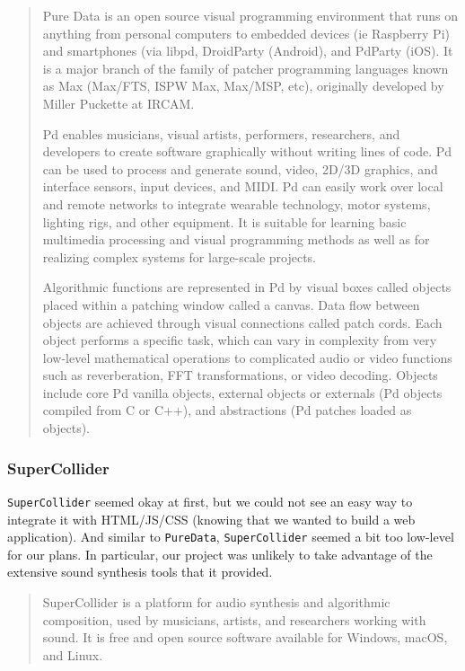 \documentclass[12pt,a4paper]{article}
\newcommand{\lightcode}[1]{\colorbox{light-gray}{\texttt{#1}}}
\begin{document}
\begin{quote}
Pure Data is an open source visual programming environment that runs on anything from personal computers to embedded devices (ie Raspberry Pi) and smartphones (via libpd, DroidParty (Android), and PdParty (iOS). It is a major branch of the family of patcher programming languages known as Max (Max/FTS, ISPW Max, Max/MSP, etc), originally developed by Miller Puckette at IRCAM.

Pd enables musicians, visual artists, performers, researchers, and developers to create software graphically without writing lines of code. Pd can be used to process and generate sound, video, 2D/3D graphics, and interface sensors, input devices, and MIDI. Pd can easily work over local and remote networks to integrate wearable technology, motor systems, lighting rigs, and other equipment. It is suitable for learning basic multimedia processing and visual programming methods as well as for realizing complex systems for large-scale projects.

Algorithmic functions are represented in Pd by visual boxes called objects placed within a patching window called a canvas. Data flow between objects are achieved through visual connections called patch cords. Each object performs a specific task, which can vary in complexity from very low-level mathematical operations to complicated audio or video functions such as reverberation, FFT transformations, or video decoding. Objects include core Pd vanilla objects, external objects or externals (Pd objects compiled from C or C++), and abstractions (Pd patches loaded as objects). \cite{puredata}
\end{quote}

\subsubsection{SuperCollider}
\lightcode{SuperCollider} seemed okay at first, but we could not see an easy way to integrate it with HTML/JS/CSS (knowing that we wanted to build a web application). And similar to \lightcode{PureData}, \lightcode{SuperCollider} seemed a bit too low-level for our plans. In particular, our project was unlikely to take advantage of the extensive sound synthesis tools that it provided.

\begin{quote}
SuperCollider is a platform for audio synthesis and algorithmic composition, used by musicians, artists, and researchers working with sound. It is free and open source software available for Windows, macOS, and Linux. \cite{supercollider}
\end{quote}
\end{document}
